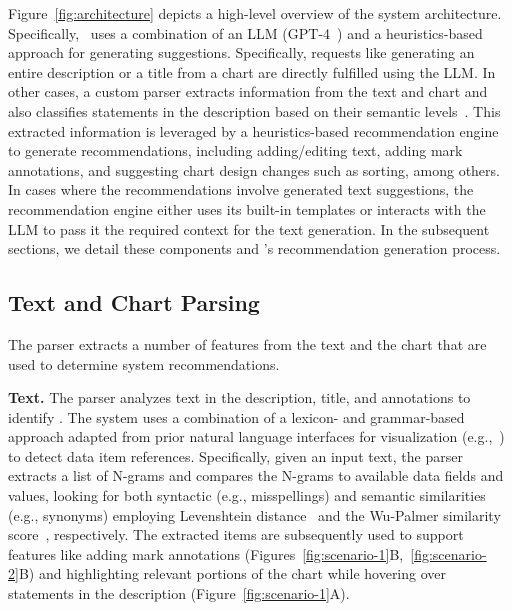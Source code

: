 Figure~\ref{fig:architecture} depicts a high-level overview of the system architecture.
Specifically, \pluto~uses a combination of an LLM (GPT-4~\cite{achiam2023gpt}) and a heuristics-based approach for generating suggestions.
Specifically, requests like generating an entire description or a title from a chart are directly fulfilled using the LLM.
In other cases, a custom parser extracts information from the text and chart and also classifies statements in the description based on their semantic levels~\cite{lundgard2021accessible}.
This extracted information is leveraged by a heuristics-based recommendation engine to generate recommendations, including adding/editing text, adding mark annotations, and suggesting chart design changes such as sorting, among others.
In cases where the recommendations involve generated text suggestions, the recommendation engine either uses its built-in templates or interacts with the LLM to pass it the required context for the text generation.
In the subsequent sections, we detail these components and \pluto's recommendation generation process.

\subsection{Text and Chart Parsing}
\label{sec:parser}

The parser extracts a number of features from the text and the chart that are used to determine system recommendations.

\textbf{Text.}
The parser analyzes text in the description, title, and annotations to identify .
The system uses a combination of a lexicon- and grammar-based approach adapted from prior natural language interfaces for visualization (e.g.,~\cite{gao2015datatone,setlur2016eviza,narechania2020nl4dv}) to detect data item references.
Specifically, given an input text, the parser extracts a list of N-grams and compares the N-grams to available data fields and values, looking for both syntactic (e.g., misspellings) and semantic similarities (e.g., synonyms) employing Levenshtein distance~\cite{yujian2007normalized} and the Wu-Palmer similarity score~\cite{wu1994verb}, respectively.
The extracted items are subsequently used to support features like adding mark annotations (Figures~\ref{fig:scenario-1}B,~\ref{fig:scenario-2}B) and highlighting relevant portions of the chart while hovering over statements in the description (Figure~\ref{fig:scenario-1}A).

